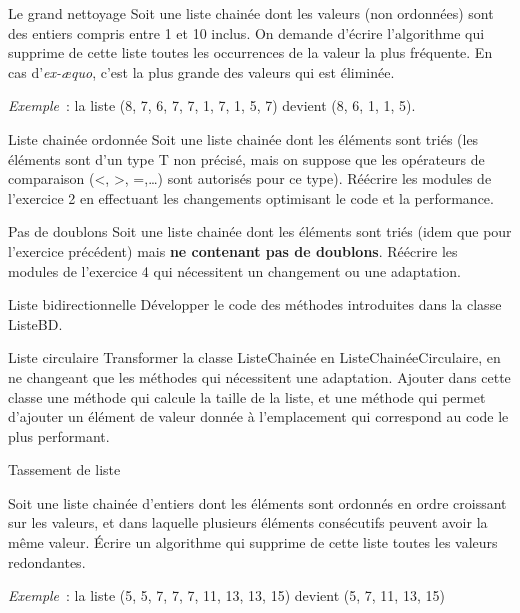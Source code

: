 	\begin{Exercice}{Le grand nettoyage}
		Soit une liste chainée dont les valeurs (non ordonnées) sont des 
		entiers compris entre 1 et 10 inclus. On demande
		d'écrire l'algorithme qui supprime de cette liste toutes les 
		occurrences de la valeur la plus fréquente. En cas
		d'\textit{ex-æquo}, c'est la plus grande des valeurs qui est éliminée.

		\textit{Exemple}~: la liste (8, 7, 6, 7, 7, 1, 7, 1, 5, 7) devient (8, 6, 1, 1, 5).
	\end{Exercice}

	\begin{Exercice}{Liste chainée ordonnée}
		Soit une liste chainée dont les éléments sont triés (les 
		éléments sont d'un type T non précisé, mais on suppose que les
		opérateurs de comparaison (<, >, =,{\dots}) sont autorisés pour 
		ce type). Réécrire les modules de l'exercice 2 en effectuant 
		les changements optimisant le code et la performance.
	\end{Exercice}

	\begin{Exercice}{Pas de doublons}
		Soit une liste chainée dont les éléments sont triés (idem 
		que pour l'exercice précédent) mais \textbf{ne contenant pas
		de doublons}. Réécrire les modules de l'exercice 4 qui 
		nécessitent un changement ou une adaptation.
	\end{Exercice}

	\begin{Exercice}{Liste bidirectionnelle}
		Développer le code des méthodes introduites dans la classe ListeBD.
	\end{Exercice}
	
	\begin{Exercice}{Liste circulaire}
		Transformer la classe ListeChainée en ListeChainéeCirculaire, 
		en ne changeant que les méthodes qui nécessitent une
		adaptation. Ajouter dans cette classe une méthode qui calcule 
		la taille de la liste, et une méthode qui permet
		d'ajouter un élément de valeur donnée à l'emplacement qui 
		correspond au code le plus performant.
	\end{Exercice}

	\begin{Exercice}{Tassement de liste}
	
		Soit une liste chainée d'entiers dont les éléments sont ordonnés 
		en ordre croissant sur les valeurs, et dans laquelle
		plusieurs éléments consécutifs peuvent avoir la même valeur. 
		Écrire un algorithme qui supprime de cette liste toutes
		les valeurs redondantes.

		\textit{Exemple}~: la liste (5, 5, 7, 7, 7, 11, 13, 13, 15) devient (5, 7, 11, 13, 15)
	\end{Exercice}
	
